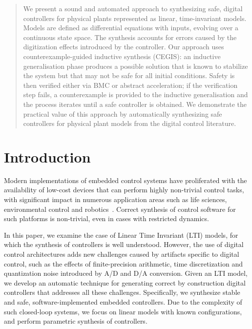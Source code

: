 \documentclass[twocolumn]{autart}    %
\begin{document}
\begin{frontmatter}
\begin{abstract}                          %
We present a sound and automated approach to synthesizing safe,
digital controllers for physical plants represented as linear,
time-invariant models. Models are defined as differential equations
with inputs, evolving over a continuous state space. The synthesis
accounts for errors caused by the digitization effects introduced by
the controller. Our approach uses counterexample-guided inductive
synthesis (CEGIS): an inductive generalisation phase produces a
possible solution that is known to stabilize the system but that may
not be safe for all initial conditions. Safety is then verified either
via BMC or abstract acceleration; if the verification step fails, a
counterexample is provided to the inductive generalisation and the
process iterates until a safe controller is obtained.  We demonstrate
the practical value of this approach by automatically synthesizing
safe controllers for physical plant models from the digital control
literature.
\end{abstract}

\end{frontmatter}

\section{Introduction}

Modern implementations of embedded control systems have proliferated
with the availability of low-cost devices that can perform highly
non-trivial control tasks, with significant impact in numerous
application areas such as life sciences, environmental control and
robotics~\cite{astrom1997computer, Franklin15}.  Correct synthesis of
control software for such platforms is non-trivial, even in cases with
restricted dynamics.

In this paper, we examine the case of Linear Time Invariant (LTI)
models, for which the synthesis of controllers is well understood.
However, the use of digital control architectures adds new challenges
caused by artifacts specific to digital control, such as the effects
of finite-precision arithmetic, time discretization and quantization
noise introduced by A/D and D/A conversion.
%
Given an LTI model, we develop an automatic technique for generating
correct by construction digital controllers that addresses all these
challenges. Specifically, we synthesize stable and safe,
software-implemented embedded controllers.  Due to the complexity of
such closed-loop systems, we focus on linear models with known
configurations, and perform parametric synthesis of controllers.
\end{document}
